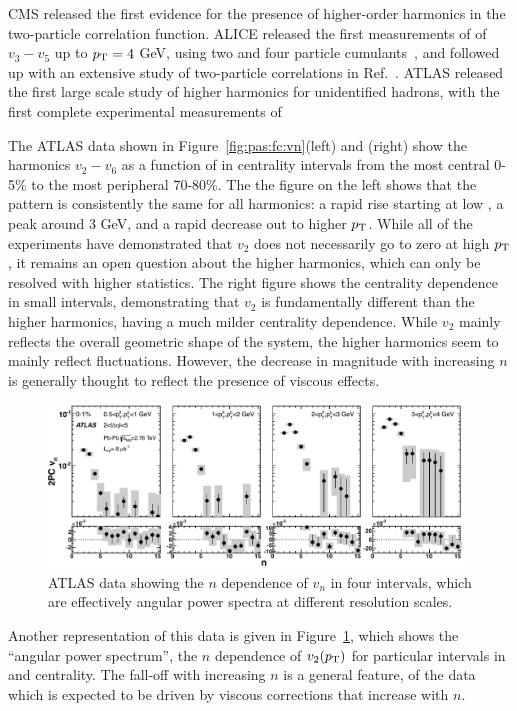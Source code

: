 CMS released the first evidence for the presence of higher-order harmonics in the two-particle
correlation function.  ALICE released the first measurements of of $v_3-v_5$ up to $\mbox{$p_{\mathrm{T}}$}=4$ GeV,
using two and four particle cumulants~\cite{ALICE:2011ab}, and followed up with an extensive study of two-particle
correlations in Ref.~\cite{Aamodt:2011by}.
ATLAS released the first large scale study of higher harmonics
for unidentified hadrons, with the first complete experimental measurements of

The ATLAS data shown in Figure~\ref{fig:pas:fc:vn}(left) and (right) show the harmonics $v_2 - v_6$ as
a function of \pT in centrality intervals from the most central 0-5\% to the most peripheral 70-80\%.
The the figure on the left shows that the pattern is consistently the same for all harmonics: 
a rapid rise starting at low \pT, a peak around 3 GeV, and a
rapid decrease out to higher $\mbox{$p_{\mathrm{T}}$}$.  While all of the experiments have demonstrated that $v_2$ does not 
necessarily go to zero at high $\mbox{$p_{\mathrm{T}}$}$, it remains an open question about the higher harmonics, which can
only be resolved with higher statistics.
The right figure shows the centrality dependence in small \pT intervals, demonstrating that $v_2$ is fundamentally
different than the higher harmonics, having a much milder centrality dependence.  While $v_2$ mainly reflects
the overall geometric shape of the system, the higher harmonics seem to mainly reflect fluctuations.
However, the decrease in magnitude with increasing $n$ is generally thought to reflect the presence of viscous effects.

\begin{figure}[!tb]
\begin{center}
\includegraphics[width=0.98\textwidth]{flowcorrelations_figs/atlas_vn_fig_13.pdf}
\caption[]{
ATLAS data showing the $n$ dependence of $v_n$ in four \pT intervals, which are effectively
angular power spectra at different resolution scales.
}
\label{fig:pas:fc:powerspec}
\end{center}
\end{figure}
Another representation of this data is given in Figure~\ref{fig:pas:fc:powerspec}, which shows the ``angular power spectrum'',
the $n$ dependence of $v_2(\mbox{$p_{\mathrm{T}}$})$ for particular intervals in \pT and centrality.  The fall-off with increasing $n$ is a general
feature, of the data which is expected to be driven by viscous corrections that increase with $n$.

